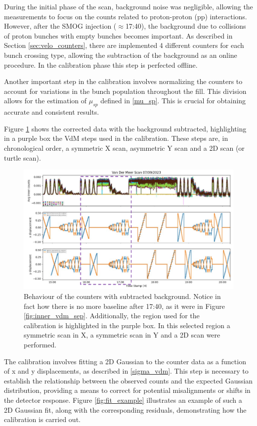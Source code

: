 During the initial phase of the scan, background noise was negligible, allowing the measurements to focus on the counts related to proton-proton (pp) interactions. However, after the SMOG injection ($\approx$17:40), the background due to collisions of proton bunches with empty bunches becomes important. As described in Section \ref{sec:velo_counters}, there are implemented 4 different counters for each bunch crossing type, allowing the subtraction of the background as an online procedure. In the calibration phase this step is perfected offline. 

Another important step in the calibration involves normalizing the counters to account for variations in the bunch population throughout the fill. This division allows for the estimation of $\mu_{sp}$ defined in \eqref{mu_sp}. This is crucial for obtaining accurate and consistent results.

Figure \ref{fig:bkg_sub_calib} shows the corrected data with the background subtracted, highlighting in a purple box the VdM steps used in the calibration. These steps are, in chronological order, a symmetric X scan, asymmetric Y scan and a 2D scan (or turtle scan). 

\begin{figure}
    \centering
    \includegraphics[width=\textwidth]{figures/calibration_period.png}
    \caption{Behaviour of the counters with subtracted background. Notice in fact how there is no more baseline after 17:40, as it were in Figure \ref{fig:inner_vdm_sep}. Additionally, the region used for the calibration is highlighted in the purple box. In this selected region a symmetric scan in X, a symmetric scan in Y and a 2D scan were performed.}
    \label{fig:bkg_sub_calib}
\end{figure}

The calibration involves fitting a 2D Gaussian to the counter data as a function of x and y displacements, as described in \eqref{sigma_vdm}. This step is necessary to establish the relationship between the observed counts and the expected Gaussian distribution, providing a means to correct for potential misalignments or shifts in the detector response. Figure \ref{fig:fit_example} illustrates an example of such a 2D Gaussian fit, along with the corresponding residuals, demonstrating how the calibration is carried out.


